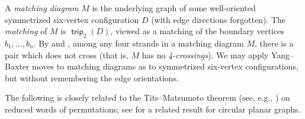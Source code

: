 \documentclass{amsart}
\theoremstyle{definition}
\theoremstyle{remark}
\numberwithin{equation}{section}
\DeclareMathOperator{\trip}{\mathsf{trip}}
\newcommand{\symm}{symmetrized }
\begin{document}
A \emph{matching diagram} $M$ is the underlying graph of some well-oriented \symm six-vertex configuration $D$ (with edge directions forgotten). The \emph{matching} of $M$ is $\trip_2(D)$, viewed as a matching of the boundary vertices $b_1,\ldots,b_n$. By  and , among any four strands in a matching diagram $M$, there is a pair which does not cross (that is, $M$ has no \emph{4-crossings}). We may apply Yang--Baxter moves to matching diagrams as to \symm six-vertex configurations, but without remembering the edge orientations.

The following is closely related to the Tits--Matsumoto theorem (see, e.g., \cite[Thm.~3.3.1]{Bjorner.Brenti}) on reduced words of permutations; see \cite[\S7]{Curtis.Ingerman.Morrow} for a related result for circular planar graphs.
\end{document}
